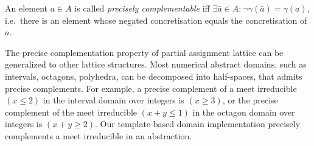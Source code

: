\begin{definition} 
An element $a\in A$ is called \emph{precisely complementable}
iff $\exists \bar{a} \in A: \neg\gamma(\bar{a})=\gamma(a)$, 
i.e.\ there is an element whose negated concretisation equals
the concretisation of $a$.
\end{definition}

%
%
The precise complementation property of partial assignment lattice can
be generalized to other lattice structures.  Most numerical abstract
domains, such as intervals, octagons, polyhedra, can be decomposed
into half-spaces, that admits precise complements.  For example, a
precise complement of a meet irreducible $(x \leq 2)$ in the interval
domain over integers is $(x \geq 3)$, or the precise complement of
the meet irreducible $(x+y \leq 1)$ in the octagon domain over
integers is $(x+y \geq 2)$.  Our template-based domain implementation
precisely complements a meet irreducible in an abstraction.  
% 
